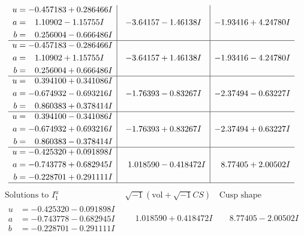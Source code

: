 \documentclass[1p]{elsarticle_modified}
\theoremstyle{definition}
\newcommand{\I}{\sqrt{-1}}
\begin{document}
$$\begin{array}{c|c|c}
\begin{aligned}
u &= -0.457183 + 0.286466 I \\
a &= \phantom{-}1.10902 - 1.15755 I \\
b &= \phantom{-}0.256004 - 0.666486 I\end{aligned}
 & -3.64157 - 1.46138 I & -1.93416 + 4.24780 I \\ \hline\begin{aligned}
u &= -0.457183 - 0.286466 I \\
a &= \phantom{-}1.10902 + 1.15755 I \\
b &= \phantom{-}0.256004 + 0.666486 I\end{aligned}
 & -3.64157 + 1.46138 I & -1.93416 - 4.24780 I \\ \hline\begin{aligned}
u &= \phantom{-}0.394100 + 0.341086 I \\
a &= -0.674932 - 0.693216 I \\
b &= \phantom{-}0.860383 + 0.378414 I\end{aligned}
 & -1.76393 - 0.83267 I & -2.37494 - 0.63227 I \\ \hline\begin{aligned}
u &= \phantom{-}0.394100 - 0.341086 I \\
a &= -0.674932 + 0.693216 I \\
b &= \phantom{-}0.860383 - 0.378414 I\end{aligned}
 & -1.76393 + 0.83267 I & -2.37494 + 0.63227 I \\ \hline\begin{aligned}
u &= -0.425320 + 0.091898 I \\
a &= -0.743778 + 0.682945 I \\
b &= -0.228701 + 0.291111 I\end{aligned}
 & \phantom{-}1.018590 - 0.418472 I & \phantom{-}8.77405 + 2.00502 I\\
 \hline 
 \end{array}$$\newpage$$\begin{array}{c|c|c}  
\text{Solutions to }I^u_{1}& \I (\text{vol} + \sqrt{-1}CS) & \text{Cusp shape}\\
 \hline 
\begin{aligned}
u &= -0.425320 - 0.091898 I \\
a &= -0.743778 - 0.682945 I \\
b &= -0.228701 - 0.291111 I\end{aligned}
 & \phantom{-}1.018590 + 0.418472 I & \phantom{-}8.77405 - 2.00502 I \\ \hline\begin{aligned}

\end{aligned}
\end{array}$$
\end{document}
